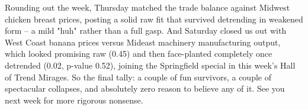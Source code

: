 Rounding out the week, Thursday matched the trade balance against Midwest chicken breast prices, posting a solid raw fit that survived detrending in weakened form -- a mild "huh" rather than a full gasp. And Saturday closed us out with West Coast banana prices versus Mideast machinery manufacturing output, which looked promising raw (0.45) and then face-planted completely once detrended (0.02, p-value 0.52), joining the Springfield special in this week's Hall of Trend Mirages. So the final tally: a couple of fun survivors, a couple of spectacular collapses, and absolutely zero reason to believe any of it. See you next week for more rigorous nonsense.
